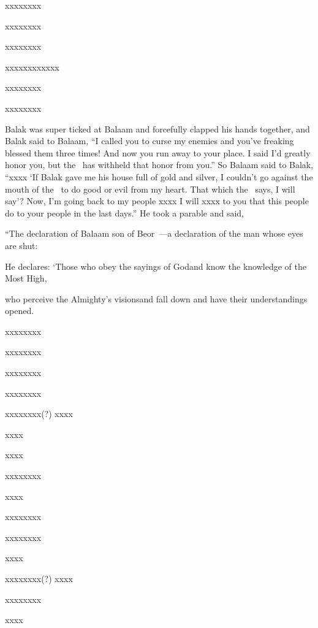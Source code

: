 \begin{inparaenum}
  \pb {} xxxx\pa xxxx%
  
  \pb xxxx\pa xxxx%
  
  \pa {} xxxx\pa xxxx%
  
  \pc xxxx\pa xxxx\pa xxxx%
  
  \pa {} xxxx\pa xxxx%
  
  \pb xxxx\pa xxxx%
  
   Balak was super ticked at Balaam and forcefully clapped his hands together, and Balak said to Balaam, ``I called you to curse my enemies and you've freaking blessed them three times!%
   And now you run away to your place. I said I'd greatly honor you, but the \lord\ has withheld that honor from you.''%
   So Balaam said to Balak, ``xxxx%
   `If Balak gave me his house full of gold and silver, I couldn't go against the mouth of the \lord\ to do good or evil from my heart. That which the \lord\ says, I will say'?%
   Now, I'm going back to my people xxxx I will xxxx to you that this people do to your people in the last days.''%
   He took a parable and said,%
  
  \pb ``The declaration of Balaam son of Beor~---\pa a declaration of the man whose eyes are shut:%
  
  \pa {} He declares:%
  `Those who obey the sayings of God\pa and know the knowledge of the Most High,%
  
  \pb who perceive the Almighty's visions\pa and fall down and have their understandings opened.%
  
  \pb {} xxxx\pa xxxx%
  
  \pb xxxx\pa xxxx%
  
  \pb xxxx\pa xxxx%
  
  \pb {} xxxx\pa xxxx%
  
  \pb xxxx\pa xxxx(?)  xxxx%
  
  \pb xxxx%
  
   xxxx%
  
  \pb xxxx\pa xxxx%
  
   xxxx%
  
  \pb xxxx\pa xxxx%
  
  \pa {} xxxx\pa xxxx%
  
   xxxx%
  
  \pb xxxx\pa xxxx(?)  xxxx%
  
  \pb xxxx\pa xxxx%
  
   xxxx%
\end{inparaenum}
